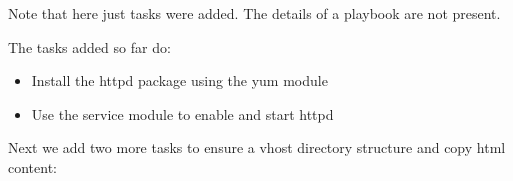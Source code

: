 \begin{Shaded}
\begin{Highlighting}[]
\PreprocessorTok{{-}{-}{-}}
\KeywordTok{{-}}\AttributeTok{ }\KeywordTok{:}
\AttributeTok{  }\KeywordTok{:}
\AttributeTok{    }\KeywordTok{:}
\AttributeTok{    }\KeywordTok{:}

\KeywordTok{{-}}\AttributeTok{ }\KeywordTok{:}
\AttributeTok{  }\KeywordTok{:}
\AttributeTok{    }\KeywordTok{:}
\AttributeTok{    }\KeywordTok{:}
\AttributeTok{    }\KeywordTok{:}\AttributeTok{ }
\end{Highlighting}
\end{Shaded}

Note that here just tasks were added. The details of a playbook are not
present.

The tasks added so far do:

\begin{itemize}
\tightlist
\item
  Install the httpd package using the yum module
\item
  Use the service module to enable and start httpd
\end{itemize}

Next we add two more tasks to ensure a vhost directory structure and
copy html content:

\begin{Shaded}
\begin{Highlighting}[]
\KeywordTok{{-}}\AttributeTok{ }\KeywordTok{:}
\AttributeTok{  }\KeywordTok{:}
\AttributeTok{    }\KeywordTok{:}\AttributeTok{ }
\AttributeTok{    }\KeywordTok{:}

\KeywordTok{{-}}\AttributeTok{ }\KeywordTok{:}
\AttributeTok{  }\KeywordTok{:}
\AttributeTok{    }\KeywordTok{:}
\AttributeTok{    }\KeywordTok{:}\AttributeTok{ }
\end{Highlighting}
\end{Shaded}

